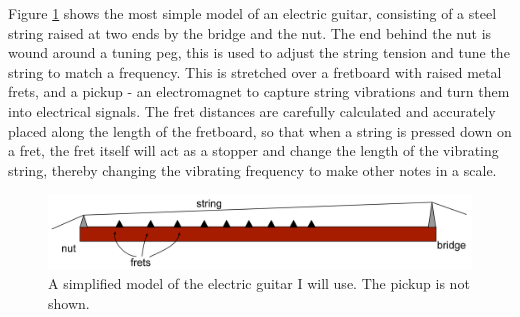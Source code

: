 Figure \ref{fig1} shows the most simple model of an electric guitar, consisting of a steel string raised at two ends by the bridge and the nut. The end behind the nut is wound around a tuning peg, this is used to adjust the string tension and tune the string to match a frequency. This is stretched over a fretboard with raised metal frets, and a pickup - an electromagnet to capture string vibrations and turn them into electrical signals. The fret distances are carefully calculated and accurately placed along the length of the fretboard, so that when a string is pressed down on a fret, the fret itself will act as a stopper and change the length of the vibrating string, thereby changing the vibrating frequency to make other notes in a scale. 
\begin{figure}[h]
    \includegraphics[width=\textwidth]{./ee/fig1.png}
    \caption{A simplified model of the electric guitar I will use. The pickup is not shown.}\label{fig1}
\end{figure} 
\FloatBarrier